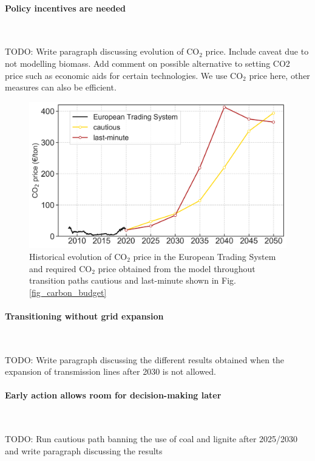 \documentclass[5p]{elsarticle} %
\begin{document}
\paragraph{\textbf{Policy incentives are needed}} \

\textcolor[rgb]{1,0,0}{TODO: Write paragraph discussing evolution of CO$_2$ price. Include caveat due to not modelling biomass. Add comment on possible alternative to setting CO2 price such as economic aids for certain technologies. We use CO$_2$ price here, other measures can also be efficient. }

\begin{figure}[!h]
\centering
\includegraphics[width=\columnwidth]{figures/co2_price.png}
\caption{Historical evolution of CO$_2$ price in the European Trading System \cite{ETS} and required CO$_2$ price obtained from the model throughout transition paths cautious and last-minute shown in Fig. \ref{fig_carbon_budget}} \label{fig_co2price} 
\end{figure}

\paragraph{\textbf{Transitioning without grid expansion}} \

\textcolor[rgb]{1,0,0}{TODO: Write paragraph discussing the different results
obtained when the expansion of transmission lines after 2030 is not allowed. }

\paragraph{\textbf{Early action allows room for decision-making later}} \

\textcolor[rgb]{1,0,0}{TODO: Run cautious path banning the use of coal and lignite after 2025/2030 and write paragraph discussing the results}
\end{document}
